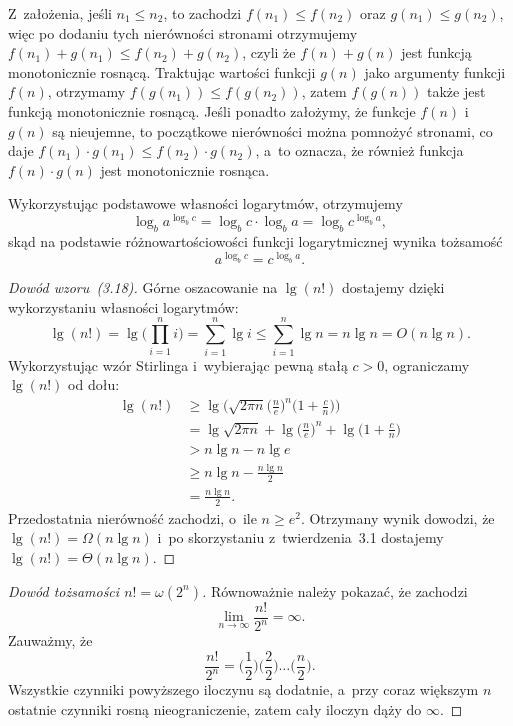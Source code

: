 
\exercise %
Z~założenia, jeśli $n_1\le n_2$, to zachodzi $f(n_1)\le f(n_2)$ oraz $g(n_1)\le g(n_2)$, więc po dodaniu tych nierówności stronami otrzymujemy $f(n_1)+g(n_1)\le f(n_2)+g(n_2)$, czyli że $f(n)+g(n)$ jest funkcją monotonicznie rosnącą. Traktując wartości funkcji $g(n)$ jako argumenty funkcji $f(n)$, otrzymamy $f(g(n_1))\le f(g(n_2))$, zatem $f(g(n))$ także jest funkcją monotonicznie rosnącą. Jeśli ponadto założymy, że funkcje $f(n)$ i~$g(n)$ są nieujemne, to początkowe nierówności można pomnożyć stronami, co daje $f(n_1)\cdot g(n_1)\le f(n_2)\cdot g(n_2)$, a~to oznacza, że również funkcja $f(n)\cdot g(n)$ jest monotonicznie rosnąca.

\exercise %
Wykorzystując podstawowe własności logarytmów, otrzymujemy
\[
	\log_ba^{\log_bc} = \log_bc\cdot\log_ba = \log_bc^{\log_ba},
\]
skąd na podstawie różnowartościowości funkcji logarytmicznej wynika tożsamość
\[
	a^{\log_bc} = c^{\log_ba}.
\]

\exercise %
\begin{proof}[Dowód wzoru~(3.18)]
	Górne oszacowanie na $\lg(n!)$ dostajemy dzięki wykorzystaniu własności logarytmów:
	\[
	    \lg(n!) = \lg\biggl(\prod_{i=1}^ni\biggr) = \sum_{i=1}^n\lg i \le \sum_{i=1}^n\lg n = n\lg n = O(n\lg n).
	\]
	Wykorzystując wzór Stirlinga i~wybierając pewną stałą $c>0$, ograniczamy $\lg(n!)$ od dołu:
	\begin{align*}
		\lg(n!) &\ge \lg\biggl(\sqrt{2\pi n}\biggl(\frac{n}{e}\biggr)^n\biggl(1+\frac{c}{n}\biggr)\biggr) \\
		&= \lg\sqrt{2\pi n}+\lg\biggl(\frac{n}{e}\biggr)^n+\lg\biggl(1+\frac{c}{n}\biggr) \\
		&> n\lg n-n\lg e \\
		&\ge n\lg n-\frac{n\lg n}{2} \\
		&= \frac{n\lg n}{2}.
	\end{align*}
	Przedostatnia nierówność zachodzi, o~ile $n\ge e^2$. Otrzymany wynik dowodzi, że $\lg(n!)=\Omega(n\lg n)$ i~po skorzystaniu z~twierdzenia~3.1 dostajemy $\lg(n!)=\Theta(n\lg n)$.
\end{proof}

\begin{proof}[Dowód tożsamości $n!=\omega(2^n)$]
	Równoważnie należy pokazać, że zachodzi
	\[
		\lim_{n\to\infty}\frac{n!}{2^n} = \infty.
	\]
	Zauważmy, że
	\[
	    \frac{n!}{2^n} = \biggl(\frac{1}{2}\biggr)\biggl(\frac{2}{2}\biggr)\dots\biggl(\frac{n}{2}\biggr).
	\]
	Wszystkie czynniki powyższego iloczynu są dodatnie, a~przy coraz większym $n$ ostatnie czynniki rosną nieograniczenie, zatem cały iloczyn dąży do $\infty$.
\end{proof}

